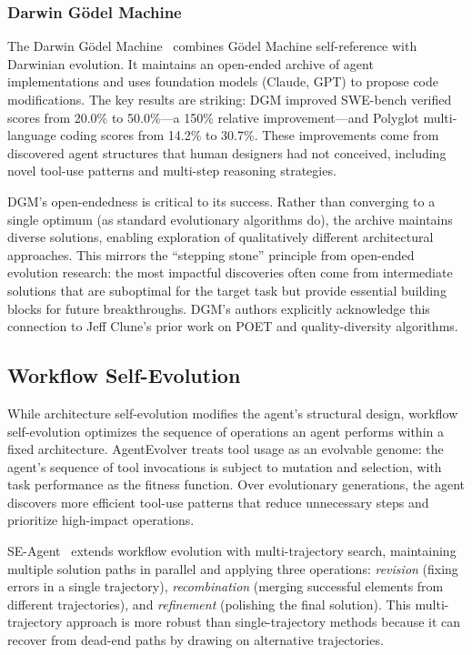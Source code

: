 \documentclass[11pt,a4paper]{article}
\begin{document}
\subsubsection{Darwin G\"{o}del Machine}

The Darwin G\"{o}del Machine~\citep{zhang2025dgm} combines G\"{o}del Machine self-reference with Darwinian evolution. It maintains an open-ended archive of agent implementations and uses foundation models (Claude, GPT) to propose code modifications. The key results are striking: DGM improved SWE-bench verified scores from 20.0\% to 50.0\%---a 150\% relative improvement---and Polyglot multi-language coding scores from 14.2\% to 30.7\%. These improvements come from discovered agent structures that human designers had not conceived, including novel tool-use patterns and multi-step reasoning strategies.

DGM's open-endedness is critical to its success. Rather than converging to a single optimum (as standard evolutionary algorithms do), the archive maintains diverse solutions, enabling exploration of qualitatively different architectural approaches. This mirrors the ``stepping stone'' principle from open-ended evolution research: the most impactful discoveries often come from intermediate solutions that are suboptimal for the target task but provide essential building blocks for future breakthroughs. DGM's authors explicitly acknowledge this connection to Jeff Clune's prior work on POET and quality-diversity algorithms.

\subsection{Workflow Self-Evolution}

While architecture self-evolution modifies the agent's structural design, workflow self-evolution optimizes the sequence of operations an agent performs within a fixed architecture. AgentEvolver treats tool usage as an evolvable genome: the agent's sequence of tool invocations is subject to mutation and selection, with task performance as the fitness function. Over evolutionary generations, the agent discovers more efficient tool-use patterns that reduce unnecessary steps and prioritize high-impact operations.

SE-Agent~\citep{rafaelov2024seagent} extends workflow evolution with multi-trajectory search, maintaining multiple solution paths in parallel and applying three operations: \emph{revision} (fixing errors in a single trajectory), \emph{recombination} (merging successful elements from different trajectories), and \emph{refinement} (polishing the final solution). This multi-trajectory approach is more robust than single-trajectory methods because it can recover from dead-end paths by drawing on alternative trajectories.
\end{document}
